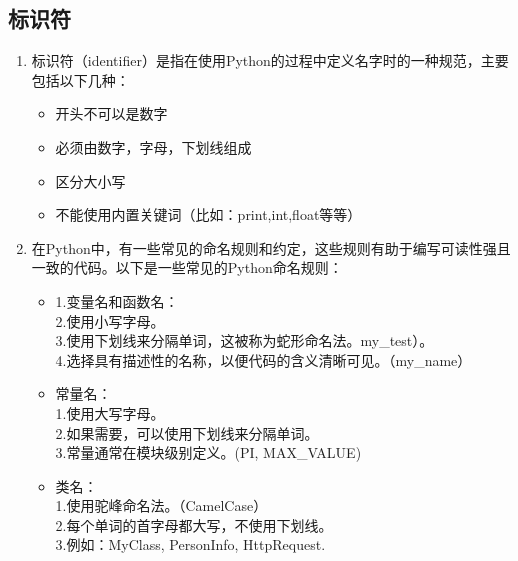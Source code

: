 
\subsection{标识符}

\begin{enumerate}
\item 标识符（identifier）是指在使用Python的过程中定义名字时的一种规范，主要包括以下几种：
\begin{itemize}
\item 开头不可以是数字
\item 必须由数字，字母，下划线组成
\item 区分大小写
\item 不能使用内置关键词（比如：print,int,float等等）
\end{itemize}
\item 在Python中，有一些常见的命名规则和约定，这些规则有助于编写可读性强且一致的代码。以下是一些常见的Python命名规则：
\begin{itemize}
\item
1.变量名和函数名：\\
2.使用小写字母。\\
3.使用下划线来分隔单词，这被称为蛇形命名法。my_test）。\\
4.选择具有描述性的名称，以便代码的含义清晰可见。（my_name）

\item 常量名：\\
1.使用大写字母。\\
2.如果需要，可以使用下划线来分隔单词。\\
3.常量通常在模块级别定义。(PI, MAX_VALUE)\\
\item 类名：\\
1.使用驼峰命名法。（CamelCase）\\
2.每个单词的首字母都大写，不使用下划线。\\
3.例如：MyClass, PersonInfo, HttpRequest.
\end{itemize}
\end{enumerate}